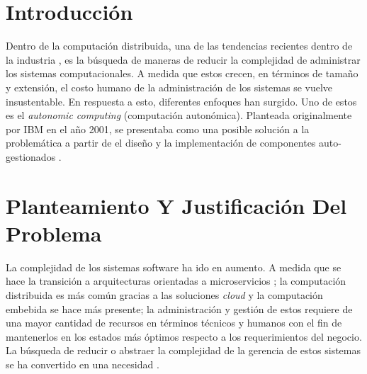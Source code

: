 \documentclass[12pt]{article}
\begin{document}
    
    
    \section{Introducción}


    Dentro de la computación distribuida, una de las tendencias recientes dentro de la industria , es la búsqueda de maneras de reducir la complejidad de administrar los sistemas computacionales. A medida que estos crecen, en términos de tamaño y extensión, el costo humano de la administración de los sistemas se vuelve insustentable. En respuesta a esto, diferentes enfoques han surgido. Uno de estos es el \textit{autonomic computing} (computación autonómica). Planteada originalmente por IBM en el año 2001, se presentaba como una posible solución a la problemática a partir de el diseño y la implementación de componentes auto-gestionados \cite{jeff_2011}. 


    \section{Planteamiento Y Justificación Del Problema}
    
    La complejidad de los sistemas software ha ido en aumento. A medida que se hace la transición a arquitecturas orientadas a microservicios \cite{forrester_research_2019}; la computación distribuida es más común gracias a las soluciones \textit{cloud} \cite{the_cloud_in_2021} y la computación embebida se hace más presente;  la administración y gestión de estos requiere de una mayor cantidad de recursos en términos técnicos y humanos con el fin de mantenerlos en los estados más óptimos respecto a los requerimientos del negocio. La búsqueda de reducir o abstraer la complejidad de la gerencia de estos sistemas se ha convertido en una necesidad \cite{lalanda_diaconescu_mccann_2014}.
    
\end{document}
